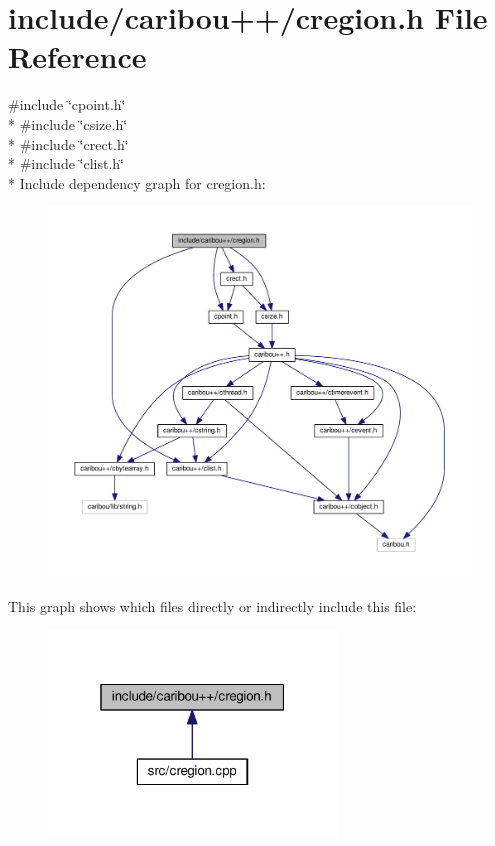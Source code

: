 \section{include/caribou++/cregion.h File Reference}
\label{cregion_8h}
{\ttfamily \#include \char`\"{}cpoint.\+h\char`\"{}}\\*
{\ttfamily \#include \char`\"{}csize.\+h\char`\"{}}\\*
{\ttfamily \#include \char`\"{}crect.\+h\char`\"{}}\\*
{\ttfamily \#include \char`\"{}clist.\+h\char`\"{}}\\*
Include dependency graph for cregion.\+h\+:
\nopagebreak
\begin{figure}[H]
\begin{center}
\leavevmode
\includegraphics[width=350pt]{cregion_8h__incl}
\end{center}
\end{figure}
This graph shows which files directly or indirectly include this file\+:
\nopagebreak
\begin{figure}[H]
\begin{center}
\leavevmode
\includegraphics[width=217pt]{cregion_8h__dep__incl}
\end{center}
\end{figure}
